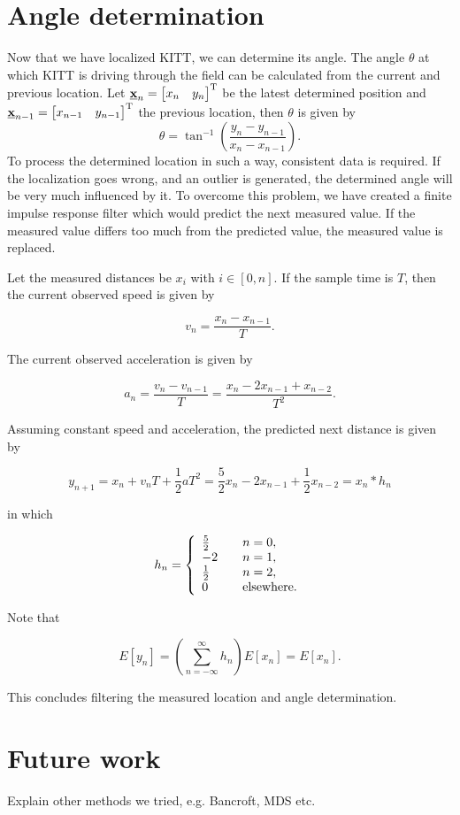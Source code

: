 \documentclass[11pt,titlepage]{report}
\begin{document}
\section{Angle determination}
Now that we have localized KITT, we can determine its angle.
The angle $\theta$ at which KITT is driving through the field can be calculated from the current and previous location. Let $\mathbf{\underline{x}}_n=\begin{bmatrix}x_n & y_n\end{bmatrix}^{\text T}$ be the latest determined position and $\mathbf{\underline{x}}_{n-1}=\begin{bmatrix}x_{n-1} & y_{n-1}\end{bmatrix}^{\text T}$ the previous location, then $\theta$ is given by
\begin{equation}
\theta = \tan^{-1}\left(\frac{y_n-y_{n-1}}{x_n-x_{n-1}}\right).
\end{equation}
To process the determined location in such a way, consistent data is required. If the localization goes wrong, and an outlier is generated, the determined angle will be very much influenced by it. To overcome this problem, we have created a finite impulse response filter which would predict the next measured value. If the measured value differs too much from the predicted value, the measured value is replaced.

Let the measured distances be $x_i$ with $i \in [0,n]$. If the sample time is $T$, then the current observed speed is given by

\begin{equation}
	v_n = \frac{x_{n} - x_{n-1}}{T}.
\end{equation}

The current observed acceleration is given by

\begin{equation}
	a_n = \frac{v_n - v_{n-1}}{T} = \frac{x_{n} - 2 x_{n-1} + x_{n-2}}{T^2}.
\end{equation}

Assuming constant speed and acceleration, the predicted next distance is given by

\begin{equation}
	y_{n+1} = x_{n} + v_n T + \frac{1}{2} a T^2 = \frac{5}{2} x_n - 2 x_{n-1} + \frac{1}{2} x_{n-2}= x_n \ast h_n
\end{equation}

in which

\begin{equation}
	h_n = \left\{
	\begin{array}{l l}
		\frac{5}{2} & \quad n = 0, \\
		-2 & \quad n = 1, \\
		\frac{1}{2} & \quad n = 2, \\
		0 & \quad \text{elsewhere}.
	\end{array}
	\right.
\end{equation}

Note that

\begin{equation}
	E[y_n] = \left( \sum_{n=-\infty}^{\infty} h_n \right) E[x_n] = E[x_n].
\end{equation}

This concludes filtering the measured location and angle determination.

\section{Future work}
\label{sec:loc_future}
Explain other methods we tried, e.g. Bancroft, MDS etc.
\end{document}
